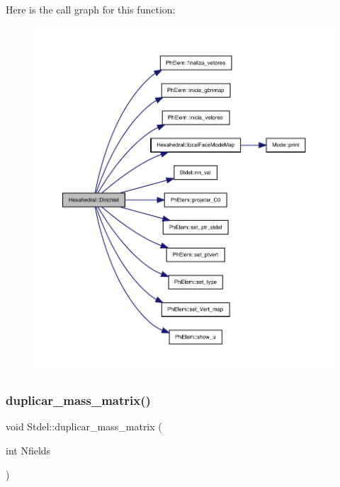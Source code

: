 Here is the call graph for this function\+:
\nopagebreak
\begin{figure}[H]
\begin{center}
\leavevmode
\includegraphics[width=350pt]{classHexahedral_a86088799f63b981f6a350397d10e2efa_cgraph}
\end{center}
\end{figure}
\mbox{\label{classStdel_a922b779be1f8f12b7a5535ab529bff64}} 
\subsubsection{\texorpdfstring{duplicar\+\_\+mass\+\_\+matrix()}{duplicar\_mass\_matrix()}}
{\footnotesize\ttfamily void Stdel\+::duplicar\+\_\+mass\+\_\+matrix (\begin{DoxyParamCaption}\item[{int}]{Nfields }\end{DoxyParamCaption})\hspace{0.3cm}{\ttfamily [inherited]}}



